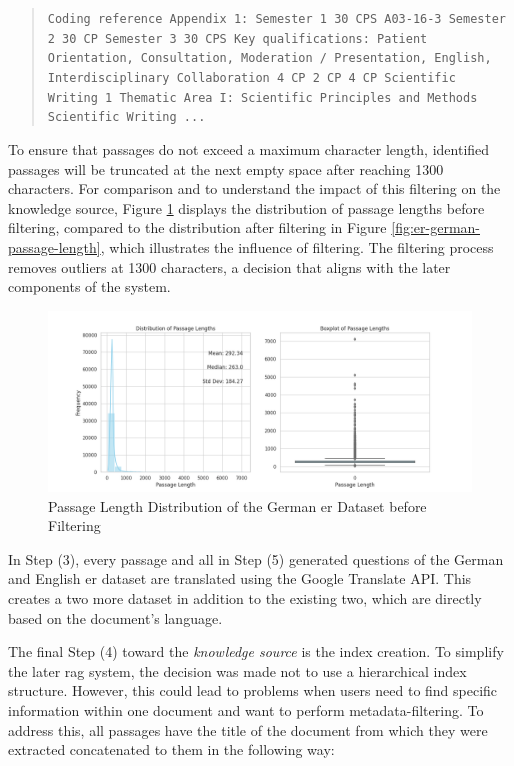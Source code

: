 \begin{quote}
    \texttt{Coding reference Appendix 1: Semester 1 30 CPS A03-16-3 Semester 2 30 CP Semester 3 30 CPS Key qualifications: Patient Orientation, Consultation, Moderation / Presentation, English, Interdisciplinary Collaboration 4 CP 2 CP 4 CP Scientific Writing 1 Thematic Area I: Scientific Principles and Methods Scientific Writing ...}
\end{quote}

To ensure that passages do not exceed a maximum character length, identified passages will be truncated at the next empty space after reaching 1300 characters. For comparison and to understand the impact of this filtering on the knowledge source, Figure \ref{fig:er-german-passage-length-old} displays the distribution of passage lengths before filtering, compared to the distribution after filtering in Figure \ref{fig:er-german-passage-length}, which illustrates the influence of filtering. The filtering process removes outliers at 1300 characters, a decision that aligns with the later components of the system.

\begin{figure}
    \centering
    \includegraphics[width=\textwidth]{Grafiken/Statistiken/IndexGerman_Passage_Length_Statistics_old.png}
    \caption{Passage Length Distribution of the German \gls{er} Dataset before Filtering}
    \label{fig:er-german-passage-length-old}
\end{figure}

In Step (3), every passage and all in Step (5) generated questions of the German and English \gls{er} dataset are translated using the Google Translate API. This creates a two more dataset in addition to the existing two, which are directly based on the document's language.

The final Step (4) toward the \textit{knowledge source} is the index creation. To simplify the later \gls{rag} system, the decision was made not to use a hierarchical index structure. However, this could lead to problems when users need to find specific information within one document and want to perform metadata-filtering. To address this, all passages have the title of the document from which they were extracted concatenated to them in the following way:

